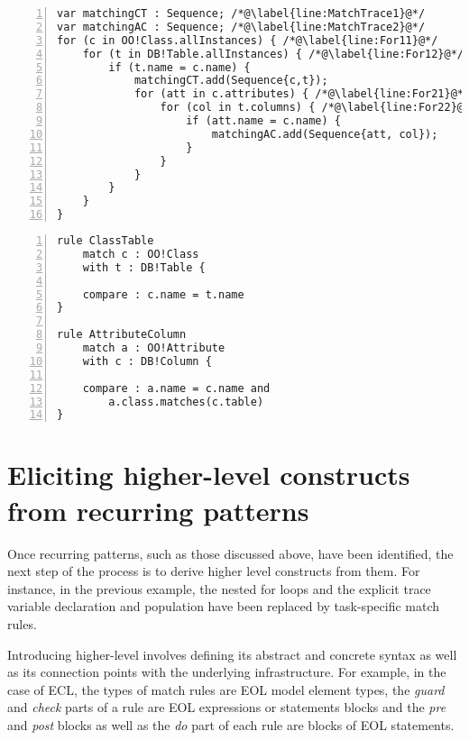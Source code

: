 \begin{lstlisting}[basicstyle=\ttfamily\footnotesize, flexiblecolumns=true, numbers=left, nolol=true, caption=Comparing an OO model with a DB model using EOL, label=lst:ComparisonEOL, language=EOL, tabsize=2]
var matchingCT : Sequence; /*@\label{line:MatchTrace1}@*/
var matchingAC : Sequence; /*@\label{line:MatchTrace2}@*/
for (c in OO!Class.allInstances) { /*@\label{line:For11}@*/
	for (t in DB!Table.allInstances) { /*@\label{line:For12}@*/
		if (t.name = c.name) {
			matchingCT.add(Sequence{c,t});
			for (att in c.attributes) { /*@\label{line:For21}@*/
				for (col in t.columns) { /*@\label{line:For22}@*/
					if (att.name = c.name) {
						matchingAC.add(Sequence{att, col});
					}
				}
			}
		}
	}
}
\end{lstlisting}

\begin{lstlisting}[basicstyle=\ttfamily\footnotesize, flexiblecolumns=true, numbers=left, nolol=true, caption=Comparing an OO model with a DB model using ECL, label=lst:ComparisonECL, language=ECL, tabsize=2]
rule ClassTable
	match c : OO!Class
	with t : DB!Table {
	
	compare : c.name = t.name
}

rule AttributeColumn
	match a : OO!Attribute 
	with c : DB!Column {
	
	compare : a.name = c.name and
		a.class.matches(c.table)
}
\end{lstlisting}

\section{Eliciting higher-level constructs from recurring patterns}

Once recurring patterns, such as those discussed above, have been identified, the next step of the process is to derive higher level constructs from them. For instance, in the previous example, the nested for loops and the explicit trace variable declaration and population have been replaced by task-specific match rules.

Introducing higher-level involves defining its abstract and concrete syntax as well as its connection points with the underlying infrastructure. For example, in the case of ECL, the types of match rules are EOL model element types, the \emph{guard} and \emph{check} parts of a rule are EOL expressions or statements blocks and the \emph{pre} and \emph{post} blocks as well as the \emph{do} part of each rule are blocks of EOL statements.

